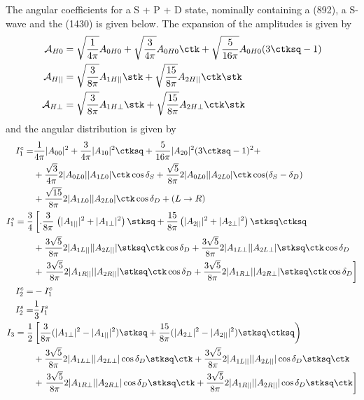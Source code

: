 The  angular coefficients for a S + P + D state, nominally containing a \Kstarzo(892), a \Kstarzz S-wave and the \Kstarzt(1430) is given below.
The expansion of the amplitudes is given by
\begin{align}
\mathcal{A}_{H0} &= \sqrt{\frac{1}{4\pi}} A_{0H0} + \sqrt{\frac{3}{4\pi}} A_{0H0} \ctk + \sqrt{\frac{5}{16\pi}} A_{0H0} ( 3\ctksq - 1 )    \\
\mathcal{A}_{H||} &= \sqrt{\frac{3}{8\pi}} A_{1H||} \stk + \sqrt{\frac{15}{8\pi}} A_{2H||} \ctk\stk  \\
\mathcal{A}_{H\bot} &= \sqrt{\frac{3}{8\pi}} A_{1H\bot} \stk + \sqrt{\frac{15}{8\pi}} A_{2H\bot} \ctk\stk  
\end{align}
and the angular distribution is given by
\begin{align}
I_1^c  =  & \frac{1}{4\pi} |A_{00}|^2 +   \frac{3}{4\pi} |A_{10}|^2 \ctksq +  \frac{5}{16\pi} |A_{20}|^2 (3\ctksq-1)^2 + \nonumber \\
          &  +  \frac{\sqrt{3}}{4\pi} 2|A_{0L0}||A_{1L0}|\ctk\cos\delta_S +  \frac{\sqrt{5}}{8\pi} 2|A_{0L0}||A_{2L0}|\ctk\cos(\delta_S-\delta_D) \nonumber \\
          &  +  \frac{\sqrt{15}}{8\pi} 2|A_{1L0}||A_{2L0}|\ctk\cos\delta_D + ( L\to R) \\
I_1^s = \frac{3}{4}  & \left[ .\frac{3}{8\pi} \right. \left(  |A_{1||}|^2  +  |A_{1\bot}|^2 \right) \stksq  + \frac{15}{8\pi} \left(  |A_{2||}|^2  + |A_{2\bot}|^2 \right) \stksq\ctksq  \nonumber \\
         & + \frac{3\sqrt{5}}{8\pi} 2|A_{1L||}||A_{2L||}| \stksq\ctk \cos\delta_D  +  \frac{3\sqrt{5}}{8\pi} 2|A_{1L\bot}||A_{2L\bot}| \stksq\ctk \cos\delta_D   \nonumber \\
         & + \left. \frac{3\sqrt{5}}{8\pi} 2|A_{1R||}||A_{2R||}| \stksq\ctk \cos\delta_D  +  \frac{3\sqrt{5}}{8\pi} 2|A_{1R\bot}||A_{2R\bot}| \stksq\ctk \cos\delta_D    \right] \nonumber \\
I_2^c = & - I_1^c \\
I_2^s = & \frac{1}{3} I_1^s \\
I_3 =  \frac{1}{2}&  \left[  \frac{3}{8\pi} ( |A_{1\bot}|^2 - |A_{1||}|^2 ) \stksq  +   \frac{15}{8\pi} ( |A_{2\bot}|^2 - |A_{2||}|^2 ) \stksq\ctksq  \right) \nonumber \\
 & + \frac{3\sqrt{5}}{8\pi} 2|A_{1L\bot}||A_{2L\bot}| \cos\delta_D \stksq\ctk +  \frac{3\sqrt{5}}{8\pi} 2|A_{1L||}||A_{2L||}| \cos\delta_D \stksq\ctk  \nonumber \\
 & +  \left. \frac{3\sqrt{5}}{8\pi} 2|A_{1R\bot}||A_{2R\bot}| \cos\delta_D \stksq\ctk +  \frac{3\sqrt{5}}{8\pi} 2|A_{1R||}||A_{2R||}| \cos\delta_D \stksq\ctk  \right] \\

\end{align}
